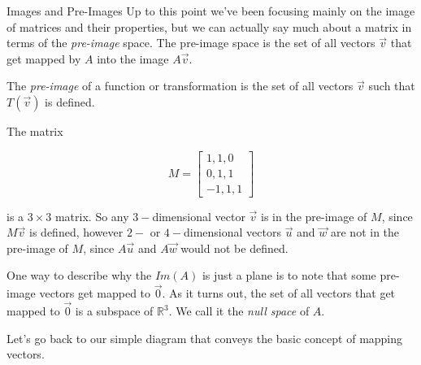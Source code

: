 \documentclass{ximera}
\begin{document}
\begin{remark}{Images and Pre-Images}
Up to this point we've been focusing mainly on the image of matrices and their properties, but we can actually say much about a matrix in terms of the \emph{pre-image} space. The pre-image space is the set of all vectors $\vec{v}$ that get mapped by $A$ into the image $A\vec{v}$. 

\begin{definition}
    The \emph{pre-image} of a function or transformation is the set of all vectors $\vec{v}$ such that $T(\vec{v})$ is defined.
\end{definition}

\begin{example}

    The matrix 
    
    $$M=\begin{bmatrix}1,1,0\\0,1,1\\-1,1,1\end{bmatrix}$$
    
    is a $3\times 3$ matrix. So any $3-$dimensional vector $\vec{v}$ is in the pre-image of $M$, since $M\vec{v}$ is defined, however $2-$ or $4-$dimensional vectors $\vec{u}$ and $\vec{w}$ are not in the pre-image of $M$, since $A\vec{u}$ and $A\vec{w}$ would not be defined.

\end{example}

One way to describe why the $Im(A)$ is just a plane is to note that some pre-image vectors get mapped to $\vec{0}$. As it turns out, the set of all vectors that get mapped to $\vec{0}$ is a subspace of $\mathbb{R}^3$. We call it the \emph{null space} of $A$.

\end{remark}

Let's go back to our simple diagram that conveys the basic concept of mapping vectors.
\end{document}
